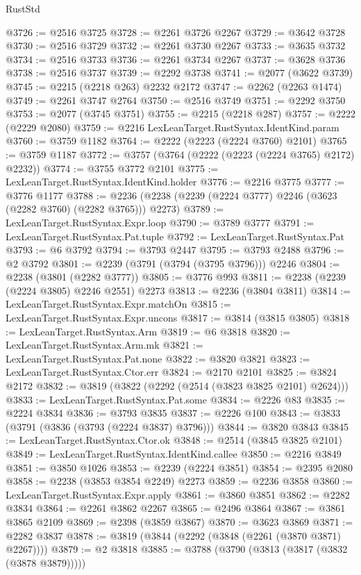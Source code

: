 \begin{lexlean}{RustStd}
\begin{coremodule}
@3726 := @2516 @3725
@3728 := @2261 @3726 @2267
@3729 := @3642 @3728
@3730 := @2516 @3729
@3732 := @2261 @3730 @2267
@3733 := @3635 @3732
@3734 := @2516 @3733
@3736 := @2261 @3734 @2267
@3737 := @3628 @3736
@3738 := @2516 @3737
@3739 := @2292 @3738
@3741 := @2077 (@3622 @3739)
@3745 := @2215 (@2218 @263) @2232 @2172
@3747 := @2262 (@2263 @1474)
@3749 := @2261 @3747 @2764
@3750 := @2516 @3749
@3751 := @2292 @3750
@3753 := @2077 (@3745 @3751)
@3755 := @2215 (@2218 @287)
@3757 := @2222 (@2229 @2080)
@3759 := @2216 LexLeanTarget.RustSyntax.IdentKind.param
@3760 := @3759 @1182
@3764 := @2222 (@2223 (@2224 @3760) @2101)
@3765 := @3759 @1187
@3772 := @3757 (@3764 (@2222 (@2223 (@2224 @3765) @2172) @2232))
@3774 := @3755 @3772 @2101
@3775 := LexLeanTarget.RustSyntax.IdentKind.holder
@3776 := @2216 @3775
@3777 := @3776 @1177
@3788 := @2236 (@2238 (@2239 (@2224 @3777) @2246 (@3623 (@2282 @3760) (@2282 @3765))) @2273)
@3789 := LexLeanTarget.RustSyntax.Expr.loop
@3790 := @3789 @3777
@3791 := LexLeanTarget.RustSyntax.Pat.tuple
@3792 := LexLeanTarget.RustSyntax.Pat
@3793 := @6 @3792
@3794 := @3793 @2447
@3795 := @3793 @2488
@3796 := @2 @3792
@3801 := @2239 (@3791 (@3794 (@3795 @3796))) @2246
@3804 := @2238 (@3801 (@2282 @3777))
@3805 := @3776 @993
@3811 := @2238 (@2239 (@2224 @3805) @2246 @2551) @2273
@3813 := @2236 (@3804 @3811)
@3814 := LexLeanTarget.RustSyntax.Expr.matchOn
@3815 := LexLeanTarget.RustSyntax.Expr.uncons
@3817 := @3814 (@3815 @3805)
@3818 := LexLeanTarget.RustSyntax.Arm
@3819 := @6 @3818
@3820 := LexLeanTarget.RustSyntax.Arm.mk
@3821 := LexLeanTarget.RustSyntax.Pat.none
@3822 := @3820 @3821
@3823 := LexLeanTarget.RustSyntax.Ctor.err
@3824 := @2170 @2101
@3825 := @3824 @2172
@3832 := @3819 (@3822 (@2292 (@2514 (@3823 @3825 @2101) @2624)))
@3833 := LexLeanTarget.RustSyntax.Pat.some
@3834 := @2226 @83
@3835 := @2224 @3834
@3836 := @3793 @3835
@3837 := @2226 @100
@3843 := @3833 (@3791 (@3836 (@3793 (@2224 @3837) @3796)))
@3844 := @3820 @3843
@3845 := LexLeanTarget.RustSyntax.Ctor.ok
@3848 := @2514 (@3845 @3825 @2101)
@3849 := LexLeanTarget.RustSyntax.IdentKind.callee
@3850 := @2216 @3849
@3851 := @3850 @1026
@3853 := @2239 (@2224 @3851)
@3854 := @2395 @2080
@3858 := @2238 (@3853 @3854 @2249) @2273
@3859 := @2236 @3858
@3860 := LexLeanTarget.RustSyntax.Expr.apply
@3861 := @3860 @3851
@3862 := @2282 @3834
@3864 := @2261 @3862 @2267
@3865 := @2496 @3864
@3867 := @3861 @3865 @2109
@3869 := @2398 (@3859 @3867)
@3870 := @3623 @3869
@3871 := @2282 @3837
@3878 := @3819 (@3844 (@2292 (@3848 (@2261 (@3870 @3871) @2267))))
@3879 := @2 @3818
@3885 := @3788 (@3790 (@3813 (@3817 (@3832 (@3878 @3879)))))

\end{coremodule}
\end{lexlean}
